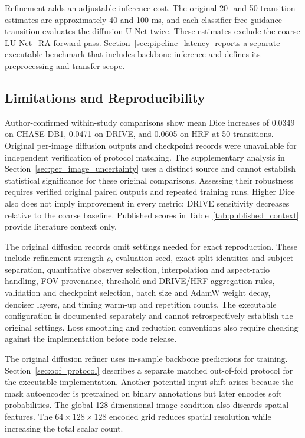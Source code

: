 \documentclass[jimaging,article,submit,pdftex,moreauthors]{Definitions/mdpi}%
\begin{document}
Refinement adds an adjustable inference cost. The original 20- and 50-transition estimates are approximately 40 and 100 ms, and each classifier-free-guidance transition evaluates the diffusion U-Net twice. These estimates exclude the coarse LU-Net+RA forward pass. Section~\ref{sec:pipeline_latency} reports a separate executable benchmark that includes backbone inference and defines its preprocessing and transfer scope.



\subsection{Limitations and Reproducibility}

\label{sec:limitations}



Author-confirmed within-study comparisons show mean Dice increases of 0.0349 on CHASE-DB1, 0.0471 on DRIVE, and 0.0605 on HRF at 50 transitions. Original per-image diffusion outputs and checkpoint records were unavailable for independent verification of protocol matching. The supplementary analysis in Section~\ref{sec:per_image_uncertainty} uses a distinct source and cannot establish statistical significance for these original comparisons. Assessing their robustness requires verified original paired outputs and repeated training runs. Higher Dice also does not imply improvement in every metric: DRIVE sensitivity decreases relative to the coarse baseline. Published scores in Table~\ref{tab:published_context} provide literature context only.



The original diffusion records omit settings needed for exact reproduction. These include refinement strength $\rho$, evaluation seed, exact split identities and subject separation, quantitative observer selection, interpolation and aspect-ratio handling, FOV provenance, threshold and DRIVE/HRF aggregation rules, validation and checkpoint selection, batch size and AdamW weight decay, denoiser layers, and timing warm-up and repetition counts. The executable configuration is documented separately and cannot retrospectively establish the original settings. Loss smoothing and reduction conventions also require checking against the implementation before code release.



The original diffusion refiner uses in-sample backbone predictions for training. Section~\ref{sec:oof_protocol} describes a separate matched out-of-fold protocol for the executable implementation. Another potential input shift arises because the mask autoencoder is pretrained on binary annotations but later encodes soft probabilities. The global 128-dimensional image condition also discards spatial features. The $64\times128\times128$ encoded grid reduces spatial resolution while increasing the total scalar count.
\end{document}
